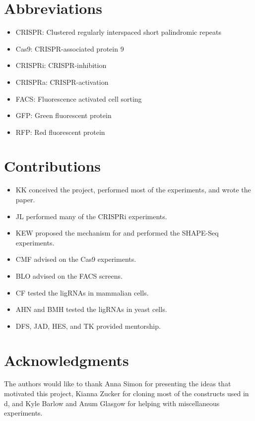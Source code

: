 \documentclass[10pt,oneside]{article}
\begin{document}
\section{Abbreviations}

\begin{itemize}
    \item CRISPR: Clustered regularly interspaced short palindromic repeats
    \item Cas9: CRISPR-associated protein 9
    \item CRISPRi: CRISPR-inhibition
    \item CRISPRa: CRISPR-activation
    \item FACS: Fluorescence activated cell sorting
    \item GFP: Green fluorescent protein
    \item RFP: Red fluorescent protein
\end{itemize}

\section{Contributions}

\begin{itemize}
    \item KK conceived the project, performed most of the experiments, and wrote the paper.
    \item JL performed many of the CRISPRi experiments.
    \item KEW proposed the mechanism for \ligrnaB{} and performed the SHAPE-Seq experiments.
    \item CMF advised on the \invitro{} Cas9 experiments.
    \item BLO advised on the FACS screens.
    \item CF tested the ligRNAs in mammalian cells.
    \item AHN and BMH tested the ligRNAs in yeast cells.
    \item DFS, JAD, HES, and TK provided mentorship.
\end{itemize}

\section{Acknowledgments}

The authors would like to thank Anna Simon for presenting the ideas that motivated this project, Kianna Zucker for cloning most of the constructs used in d, and Kyle Barlow and Anum Glasgow for helping with miscellaneous experiments.
\end{document}
